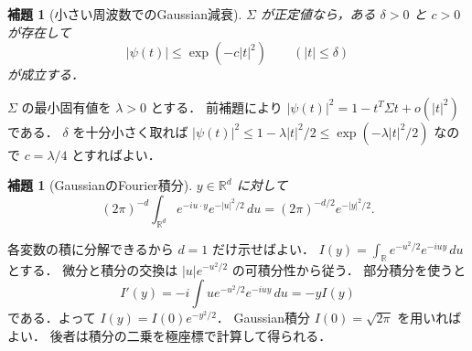 \documentclass[a5paper,10pt,onecolumn]{jsarticle}
\makeatletter
\theoremstyle{mathnotetheorem}
\newtheorem{lemma}[theorem]{補題}
\renewcommand{\proofname}{証明}
\renewenvironment{proof}[1][\proofname]{%
  \par\pushQED{\qed}\normalfont\topsep4\p@\@plus2\p@\relax
  \trivlist\item[\hskip\labelsep\bfseries #1]\ignorespaces
}{\popQED\endtrivlist\@endpefalse}
\makeatother
\begin{document}
\begin{lemma}[小さい周波数でのGaussian減衰]\label{lem:bound}
$\Sigma$ が正定値なら，ある $\delta>0$ と $c>0$ が存在して
\[
 |\psi(t)|\le\exp(-c|t|^2)\qquad(|t|\le\delta)
\]
が成立する．
\end{lemma}
\begin{proof}
$\Sigma$ の最小固有値を $\lambda>0$ とする．
前補題により
$|\psi(t)|^2=1-t^T\Sigma t+o(|t|^2)$ である．
$\delta$ を十分小さく取れば
$|\psi(t)|^2\le1-\lambda|t|^2/2
\le\exp(-\lambda|t|^2/2)$ なので
$c=\lambda/4$ とすればよい．
\end{proof}

\begin{lemma}[GaussianのFourier積分]\label{lem:gauss}
$y\in\mathbb R^d$ に対して
\[
 (2\pi)^{-d}\int_{\mathbb R^d}
     e^{-iu\cdot y}e^{-|u|^2/2}\,du
       =(2\pi)^{-d/2}e^{-|y|^2/2}.
\]
\end{lemma}
\begin{proof}
各変数の積に分解できるから $d=1$ だけ示せばよい．
$I(y)=\int_{\mathbb R}e^{-u^2/2}e^{-iuy}\,du$ とする．
微分と積分の交換は $|u|e^{-u^2/2}$ の可積分性から従う．
部分積分を使うと
\[
 I'(y)=-i\int ue^{-u^2/2}e^{-iuy}\,du=-yI(y)
\]
である．よって $I(y)=I(0)e^{-y^2/2}$．
Gaussian積分 $I(0)=\sqrt{2\pi}$ を用いればよい．
後者は積分の二乗を極座標で計算して得られる．
\end{proof}
\end{document}
